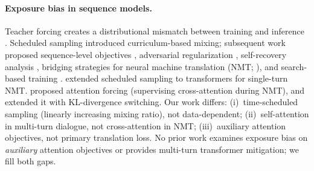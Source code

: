 \paragraph{Exposure bias in sequence models.}
Teacher forcing creates a distributional mismatch between training and inference \citep{wiseman2016sequence,arora2022exposure}. Scheduled sampling \citep{bengio2015scheduled} introduced curriculum-based mixing; subsequent work proposed sequence-level objectives \citep{ranzato2016sequence}, adversarial regularization \citep{lamb2016professor}, self-recovery analysis \citep{he2019exposure}, bridging strategies for neural machine translation (NMT; \citealp{zhang2019bridging}), and search-based training \citep{leblond2018searnn}. \citet{mihaylova2019scheduled} extended scheduled sampling to transformers for single-turn NMT. \citet{dou2019attention} proposed attention forcing (supervising cross-attention during NMT), and \citet{dou2022parallel} extended it with KL-divergence switching. Our work differs: (i)~time-scheduled sampling (linearly increasing mixing ratio), not data-dependent; (ii)~self-attention in multi-turn dialogue, not cross-attention in NMT; (iii)~auxiliary attention objectives, not primary translation loss. No prior work examines exposure bias on \emph{auxiliary} attention objectives or provides multi-turn transformer mitigation; we fill both gaps.

